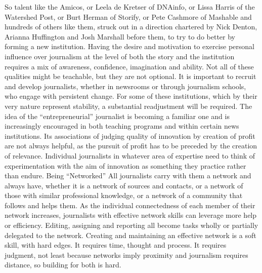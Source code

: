 So talent like the Amicos, or Leela de Kretser of DNAinfo, or Lissa Harris of
the Watershed Post, or Burt Herman of Storify, or Pete Cashmore of Mashable
and hundreds of others like them, struck out in a direction chartered by Nick
Denton, Arianna Huffington and Josh Marshall before them, to try to do better
by forming a new institution.
Having the desire and motivation to exercise personal influence over journalism
at the level of both the story and the institution requires a mix of awareness,
confidence, imagination and ability.
Not all of these qualities might be teachable, but they are not optional. It is
important to recruit and develop journalists, whether in newsrooms or through
journalism schools, who engage with persistent change. For some of these institutions,
which by their very nature represent stability, a substantial readjustment
will be required.
The idea of the ``entrepreneurial'' journalist is becoming a familiar one and is
increasingly encouraged in both teaching programs and within certain news
institutions. Its associations of judging quality of innovation by creation of
profit are not always helpful, as the pursuit of profit has to be preceded by the
creation of relevance. Individual journalists in whatever area of expertise need
to think of experimentation with the aim of innovation as something they
practice rather than endure.
Being ``Networked''
All journalists carry with them a network and always have, whether it is a network
of sources and contacts, or a network of those with similar professional
knowledge, or a network of a community that follows and helps them. As the
individual connectedness of each member of their network increases, journalists
with effective network skills can leverage more help or efficiency. Editing, assigning
and reporting all become tasks wholly or partially delegated to the network.
Creating and maintaining an effective network is a soft skill, with hard edges.
It requires time, thought and process. It requires judgment, not least because
networks imply proximity and journalism requires distance, so building for
both is hard.

